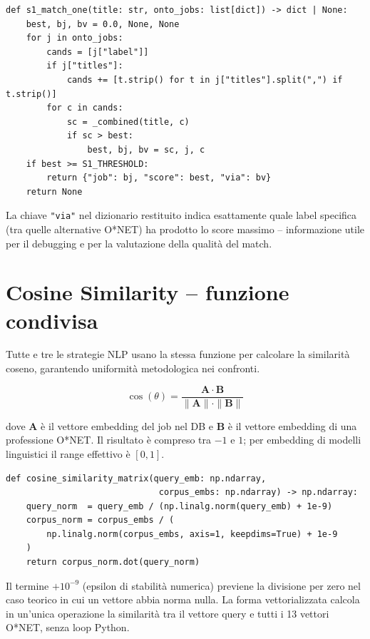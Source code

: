 \documentclass[12pt, a4paper]{report}
\begin{document}
\begin{lstlisting}[caption={Funzione di matching S1}]
def s1_match_one(title: str, onto_jobs: list[dict]) -> dict | None:
    best, bj, bv = 0.0, None, None
    for j in onto_jobs:
        cands = [j["label"]]
        if j["titles"]:
            cands += [t.strip() for t in j["titles"].split(",") if t.strip()]
        for c in cands:
            sc = _combined(title, c)
            if sc > best:
                best, bj, bv = sc, j, c
    if best >= S1_THRESHOLD:
        return {"job": bj, "score": best, "via": bv}
    return None
\end{lstlisting}

La chiave \texttt{"via"} nel dizionario restituito indica esattamente
quale label specifica (tra quelle alternative O*NET) ha prodotto lo
score massimo -- informazione utile per il debugging e per la
valutazione della qualità del match.

% 
\section{Cosine Similarity -- funzione condivisa}

Tutte e tre le strategie NLP usano la stessa funzione per calcolare
la similarità coseno, garantendo uniformità metodologica nei confronti.

\begin{equation}
\cos(\theta) = \frac{\mathbf{A} \cdot \mathbf{B}}{\|\mathbf{A}\| \cdot \|\mathbf{B}\|}
\end{equation}

dove $\mathbf{A}$ è il vettore embedding del job nel DB e $\mathbf{B}$
è il vettore embedding di una professione O*NET. Il risultato è
compreso tra $-1$ e $1$; per embedding di modelli linguistici il
range effettivo è $[0, 1]$.
\newpage
\begin{lstlisting}[caption={Implementazione vettorializzata della cosine similarity}]
def cosine_similarity_matrix(query_emb: np.ndarray,
                              corpus_embs: np.ndarray) -> np.ndarray:
    query_norm  = query_emb / (np.linalg.norm(query_emb) + 1e-9)
    corpus_norm = corpus_embs / (
        np.linalg.norm(corpus_embs, axis=1, keepdims=True) + 1e-9
    )
    return corpus_norm.dot(query_norm)
\end{lstlisting}

Il termine $+10^{-9}$ (epsilon di stabilità numerica) previene la
divisione per zero nel caso teorico in cui un vettore abbia norma
nulla. La forma vettorializzata calcola in un'unica operazione la
similarità tra il vettore query e tutti i 13 vettori O*NET, senza
loop Python.
\end{document}
